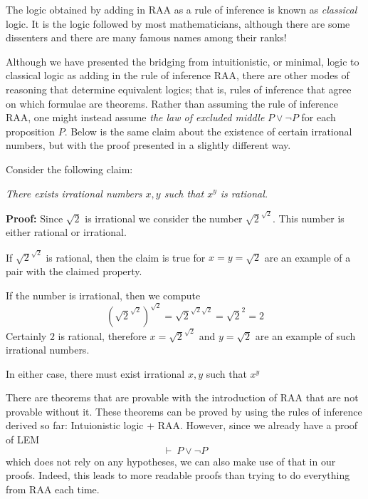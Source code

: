 \documentclass{book}
\begin{document}
    The logic obtained by adding in RAA as a rule of inference is known as \emph{classical} logic. It is the logic followed by most mathematicians, although there are some dissenters and there are many famous names among their ranks! 

    Although we have presented the bridging from intuitionistic, or minimal, logic to classical logic as adding in the rule of inference RAA, there are other modes of reasoning that determine equivalent logics; that is, rules of inference that agree on which formulae are theorems. Rather than assuming the rule of inference RAA, one might instead assume \emph{the law of excluded middle} $P \lor \lnot P$ for each proposition $P$. Below is the same claim about the existence of certain irrational numbers, but with the proof presented in a slightly different way. 

    \begin{eg}
        Consider the following claim:

        \begin{center}
            \emph{There exists irrational numbers $x,y$ such that $x^y$ is rational.}
        \end{center}

        {\bf Proof:} Since $\sqrt{2}$ is irrational we consider the number $\sqrt{2}^{\sqrt{2}}$. This number is either rational or irrational. 
        
        If $\sqrt{2}^{\sqrt{2}}$ is rational, then the claim is true for $x=y=\sqrt{2}$ are an example of a pair with the claimed property. 
        
        If the number is irrational, then we compute $$(\sqrt{2}^{\sqrt{2}})^{\sqrt{2}} = \sqrt{2}^{\sqrt{2}\sqrt{2}}=\sqrt{2}^{2}=2$$ Certainly $2$ is rational, therefore $x=\sqrt{2}^{\sqrt{2}}$ and $y=\sqrt{2}$ are an example of such irrational numbers. 

        In either case, there must exist irrational $x,y$ such that $x^{y}$
    \end{eg}

    There are theorems that are provable with the introduction of RAA that are not provable without it. These theorems can be proved by using the rules of inference derived so far: Intuionistic logic + RAA. However, since we already have a proof of LEM $$ \vdash \ P \lor \lnot P$$ which does not rely on any hypotheses, we can also make use of that in our proofs. Indeed, this leads to more readable proofs than trying to do everything from RAA each time. 
\end{document}
